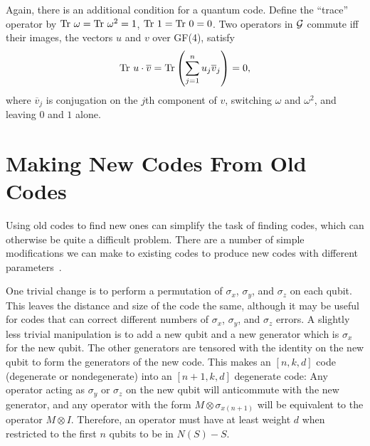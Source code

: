 \documentclass{report}
\newcommand{\G}{{\cal G}}
\newcommand{\X}{\sigma_x}
\newcommand{\Z}{\sigma_z}
\newcommand{\Y}{\sigma_y}
\newcommand{\Xs}[1]{\sigma_{x{#1}}}
\newcommand{\Sum}{\sum}
\begin{document}
Again, there is an additional condition for a quantum code.  Define the 
``trace'' operator by ${\rm Tr}\ \omega = {\rm Tr}\ \omega^2 = 1$, ${\rm 
Tr}\ 1 = {\rm Tr}\ 0 = 0$.  Two operators in $\G$ commute iff their images, 
the vectors $u$ and $v$ over GF(4), satisfy
\begin{equation}
{\rm Tr}\ u \cdot \overline{v} = {\rm Tr}\left( \Sum_{j=1}^n u_j 
\overline{v}_j \right) = 0,
\end{equation}
where $\overline{v}_j$ is conjugation on the $j$th component of $v$, 
switching $\omega$ and $\omega^2$, and leaving $0$ and $1$ alone.

\section{Making New Codes From Old Codes}
\label{sec-construction}

Using old codes to find new ones can simplify the task of finding codes, 
which can otherwise be quite a difficult problem.  There are a number of simple 
modifications we can make to existing codes to produce new codes with 
different parameters~\cite{gottesman-pasting,calderbank-GF4}.

One trivial change is to perform a permutation of $\X$, $\Y$, and $\Z$ on 
each qubit.  This leaves the distance and size of the code the same, 
although it may be useful for codes that can correct different numbers of 
$\X$, $\Y$, and $\Z$ errors.  A slightly less trivial manipulation is to add a 
new qubit and a new generator which is $\X$ for the new qubit.  The other 
generators are tensored with the identity on the new qubit to form the
generators of the new code.  This makes an $[n, k, d]$ code (degenerate or 
nondegenerate) into an $[n+1, k, d]$ degenerate code:  Any operator acting as 
$\Y$ or $\Z$ on the new qubit will anticommute with the new generator, and any 
operator with the form $M \otimes \Xs{(n+1)}$ will be equivalent to the 
operator $M \otimes I$.  Therefore, an operator must have at least weight $d$ 
when restricted to the first $n$ qubits to be in $N(S)-S$.
\end{document}
